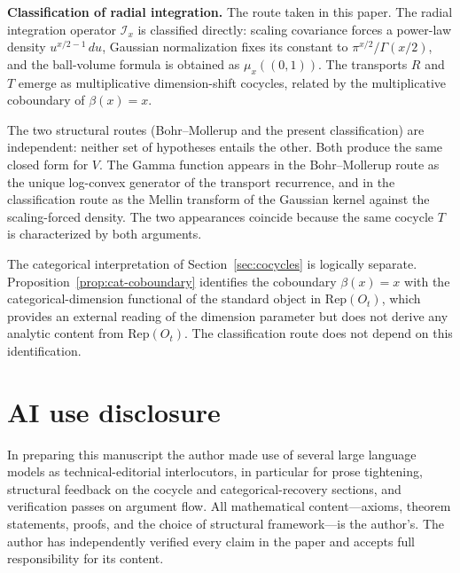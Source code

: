 \documentclass[11pt,a4paper]{article}
\theoremstyle{plain}
\theoremstyle{definition}
\theoremstyle{remark}
\newcommand{\Iop}{\mathcal{I}}
\begin{document}
\smallskip
\noindent\textbf{Classification of radial integration.} The route taken in this paper. The radial integration operator $\Iop_x$ is classified directly: scaling covariance forces a power-law density $u^{x/2-1}\,du$, Gaussian normalization fixes its constant to $\pi^{x/2}/\Gamma(x/2)$, and the ball-volume formula is obtained as $\mu_x((0,1))$. The transports $R$ and $T$ emerge as multiplicative dimension-shift cocycles, related by the multiplicative coboundary of $\beta(x)=x$.

\smallskip
The two structural routes (Bohr--Mollerup and the present classification) are independent: neither set of hypotheses entails the other. Both produce the same closed form for $V$. The Gamma function appears in the Bohr--Mollerup route as the unique log-convex generator of the transport recurrence, and in the classification route as the Mellin transform of the Gaussian kernel against the scaling-forced density. The two appearances coincide because the same cocycle $T$ is characterized by both arguments.

The categorical interpretation of Section~\ref{sec:cocycles} is logically separate. Proposition~\ref{prop:cat-coboundary} identifies the coboundary $\beta(x) = x$ with the categorical-dimension functional of the standard object in $\mathrm{Rep}(O_t)$, which provides an external reading of the dimension parameter but does not derive any analytic content from $\mathrm{Rep}(O_t)$. The classification route does not depend on this identification.

\section*{AI use disclosure}
In preparing this manuscript the author made use of several large language models as technical-editorial interlocutors, in particular for prose tightening, structural feedback on the cocycle and categorical-recovery sections, and verification passes on argument flow. All mathematical content---axioms, theorem statements, proofs, and the choice of structural framework---is the author's. The author has independently verified every claim in the paper and accepts full responsibility for its content.
\end{document}
